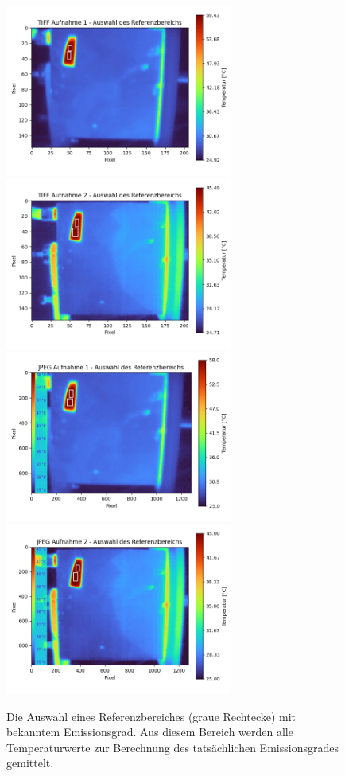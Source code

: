 \documentclass{article}
\begin{document}
\begin{figure}[H]
    \centering
    \captionsetup{width=14cm}
    \includegraphics[width=7.5cm]{img/ref_tiff_1.png}
    \includegraphics[width=7.5cm]{img/ref_tiff_2.png}
    \includegraphics[width=7.5cm]{img/ref_jpg_1.png}
    \includegraphics[width=7.5cm]{img/ref_jpg_2.png}
    \caption{
        Die Auswahl eines Referenzbereiches (graue Rechtecke) mit bekanntem Emissionsgrad.
        Aus diesem Bereich werden alle Temperaturwerte zur Berechnung des tatsächlichen Emissionsgrades gemittelt. 
        }
\end{figure}
    
\end{document}
